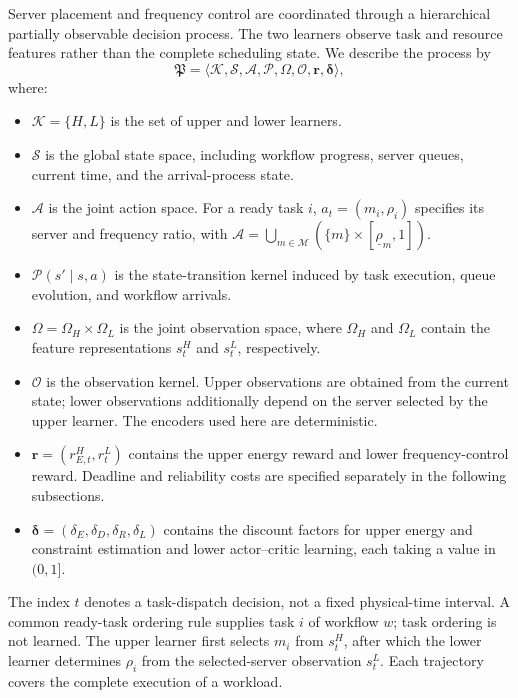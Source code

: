 \documentclass[lettersize,journal]{IEEEtran}
\begin{document}
Server placement and frequency control are coordinated through a
hierarchical partially observable decision process. The two learners
observe task and resource features rather than the complete scheduling
state. We describe the process by
\begin{equation}
 \mathfrak P=\langle\mathcal K,\mathcal S,\mathcal A,\mathcal P,
 \Omega,\mathcal O,\mathbf r,\boldsymbol\delta\rangle,
 \label{eq:method_pomdp}
\end{equation}
where:
\begin{itemize}
 \item $\mathcal K=\{H,L\}$ is the set of upper and lower learners.
 \item $\mathcal S$ is the global state space, including workflow progress,
 server queues, current time, and the arrival-process state.
 \item $\mathcal A$ is the joint action space. For a ready task $i$,
 $a_t=(m_i,\rho_i)$ specifies its server and frequency ratio, with
 $\mathcal A=\bigcup_{m\in\mathcal M}
 (\{m\}\times[\underline\rho_m,1])$.
 \item $\mathcal P(s'\mid s,a)$ is the state-transition kernel induced by
 task execution, queue evolution, and workflow arrivals.
 \item $\Omega=\Omega_H\times\Omega_L$ is the joint observation space,
 where $\Omega_H$ and $\Omega_L$ contain the feature representations
 $s_t^H$ and $s_t^L$, respectively.
 \item $\mathcal O$ is the observation kernel. Upper observations are
 obtained from the current state; lower observations additionally depend
 on the server selected by the upper learner. The encoders used here
 are deterministic.
 \item $\mathbf r=(r_{E,t}^H,r_t^L)$ contains the upper energy reward and
 lower frequency-control reward. Deadline and reliability costs are
 specified separately in the following subsections.
 \item $\boldsymbol\delta=(\delta_E,\delta_D,\delta_R,\delta_L)$ contains
 the discount factors for upper energy and constraint estimation and
 lower actor--critic learning, each taking a value in $(0,1]$.
\end{itemize}

The index $t$ denotes a task-dispatch decision, not a fixed physical-time
interval. A common ready-task ordering rule supplies task $i$ of workflow
$w$; task ordering is not learned. The upper learner first selects $m_i$
from $s_t^H$, after which the lower learner determines $\rho_i$ from the
selected-server observation $s_t^L$. Each trajectory covers the complete
execution of a workload.
\end{document}
